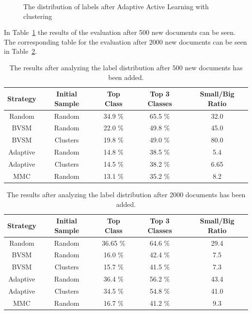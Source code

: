 \begin{figure}
    \centering
    \caption{The distribution of labels after Adaptive Active Learning with clustering}
    \label{fig:class-distribution-reuters-adaptive-clusters}
\end{figure}

In Table~\ref{tab:distribution-result-500} the results of the evaluation after 500 new documents can be seen.
The corresponding table for the evaluation after 2000 new documents can be seen in Table~\ref{tab:distribution-result-2000}.

\begin{table}
    \centering
    \begin{tabular}{|ccccc|}
        \hline
        \textbf{Strategy} & \textbf{Initial Sample} & \textbf{Top Class} & \textbf{Top 3 Classes} & \textbf{Small/Big Ratio}\\
        \hline
        Random & Random &  34.9 \% & 65.5 \% & 32.0 \\
        BVSM & Random &  22.0 \% & 49.8 \% & 45.0 \\
        BVSM & Clusters & 19.8 \% & 49.0 \% & 80.0 \\
        Adaptive & Random & 14.8 \% & 38.5 \% & 5.4 \\
        Adaptive & Clusters & 14.5 \% & 38.2 \% & 6.65 \\
        MMC & Random & 13.1 \% & 35.2 \% & 8.2 \\
        \hline
    \end{tabular}
    \caption{The results after analyzing the label distribution after 500 new documents has been added.}
    \label{tab:distribution-result-500}
\end{table}

\begin{table}
    \centering
    \begin{tabular}{|ccccc|}
        \hline
        \textbf{Strategy} & \textbf{Initial Sample} & \textbf{Top Class} & \textbf{Top 3 Classes} & \textbf{Small/Big Ratio}\\
        \hline
        Random & Random & 36.65 \% & 64.6 \% & 29.4 \\
        BVSM & Random & 16.0 \% & 42.4 \% & 7.5 \\
        BVSM & Clusters & 15.7 \% & 41.5 \% & 7.3 \\
        Adaptive & Random & 36.4 \% & 56.2 \% & 43.4 \\
        Adaptive & Clusters & 34.5 \% & 54.8 \% & 41.0 \\
        MMC & Random & 16.7 \% & 41.2 \% & 9.3 \\
        \hline
    \end{tabular}
    \caption{The results after analyzing the label distribution after 2000 documents has been added.}
    \label{tab:distribution-result-2000}
\end{table}

